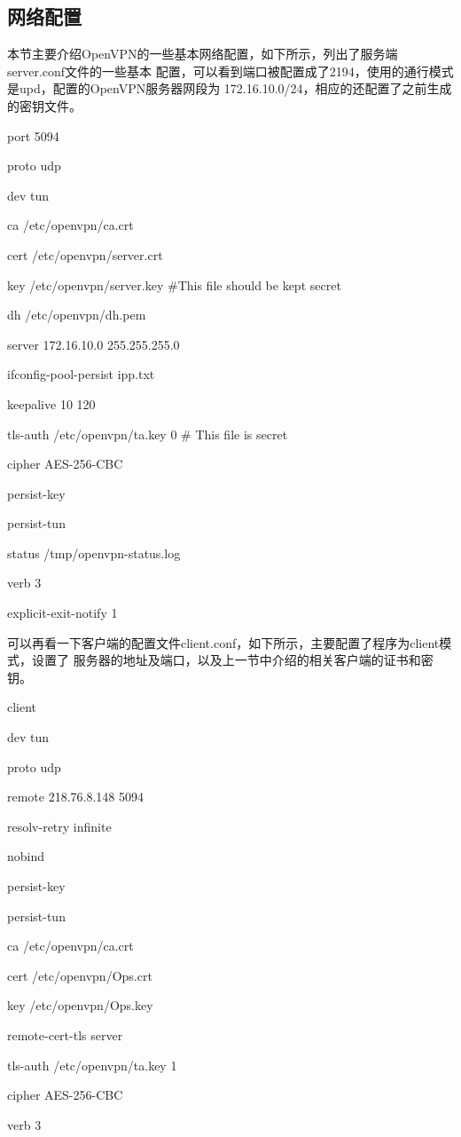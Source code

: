 \documentclass[a4paper,12pt]{report}
\begin{document}
\begin{spacing}{1.5}
\subsection{网络配置}
本节主要介绍OpenVPN的一些基本网络配置，如下所示，列出了服务端server.conf文件的一些基本
配置，可以看到端口被配置成了2194，使用的通行模式是upd，配置的OpenVPN服务器网段为
172.16.10.0/24，相应的还配置了之前生成的密钥文件。

\begin{tcolorbox}[notitle,boxrule=0pt,colback=gray!20,colframe=gray!20]
port 5094

proto udp

dev tun

ca /etc/openvpn/ca.crt

cert /etc/openvpn/server.crt

key /etc/openvpn/server.key  \#This file should be kept secret

dh /etc/openvpn/dh.pem

server 172.16.10.0 255.255.255.0

ifconfig-pool-persist ipp.txt

keepalive 10 120

tls-auth /etc/openvpn/ta.key 0 \# This file is secret

cipher AES-256-CBC

persist-key

persist-tun

status /tmp/openvpn-status.log

verb 3

explicit-exit-notify 1
\end{tcolorbox}

可以再看一下客户端的配置文件client.conf，如下所示，主要配置了程序为client模式，设置了
服务器的地址及端口，以及上一节中介绍的相关客户端的证书和密钥。

\begin{tcolorbox}[notitle,boxrule=0pt,colback=gray!20,colframe=gray!20]
client

dev tun

proto udp

remote 218.76.8.148 5094

resolv-retry infinite

nobind

persist-key

persist-tun

ca /etc/openvpn/ca.crt

cert /etc/openvpn/Ops.crt

key /etc/openvpn/Ops.key

remote-cert-tls server

tls-auth /etc/openvpn/ta.key 1

cipher AES-256-CBC

verb 3

\end{tcolorbox}


\end{spacing}
\end{document}
